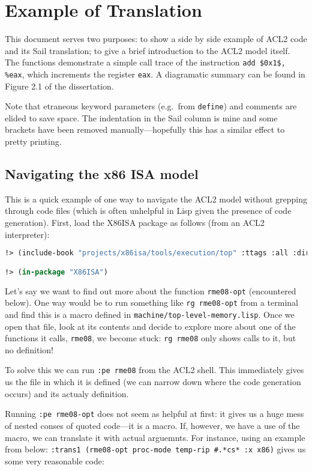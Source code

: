 \documentclass[a4paper]{article}
\begin{document}
\section{Example of Translation}

This document serves two purposes: to show a side by side example of ACL2 code and its Sail translation; to give a brief introduction to the ACL2 model itself.  The functions demonstrate a simple call trace of the instruction \texttt{add \$0x1\$, \%eax}, which increments the register \texttt{eax}.  A diagramatic summary can be found in Figure 2.1 of the dissertation.

Note that etraneous keyword parameters (e.g.~from \texttt{define}) and comments are elided to save space.  The indentation in the Sail column is mine and some brackets have been removed manually---hopefully this has a similar effect to pretty printing.

\subsection{Navigating the x86 ISA model}

This is a quick example of one way to navigate the ACL2 model without grepping through code files (which is often unhelpful in Lisp given the presence of code generation).  First, load the X86ISA package as follows (from an ACL2 interpreter):

\begin{lstlisting}[language=lisp]
!> (include-book "projects/x86isa/tools/execution/top" :ttags :all :dir :system)  

!> (in-package "X86ISA")

\end{lstlisting}

Let's say we want to find out more about the function \texttt{rme08-opt} (encountered below).  One way would be to run something like \texttt{rg rme08-opt} from a terminal and find this is a macro defined in \texttt{machine/top-level-memory.lisp}.  Once we open that file, look at its contents and decide to explore more about one of the functions it calls, \texttt{rme08}, we become stuck: \texttt{rg rme08} only shows calls to it, but no definition!

To solve this we can run \texttt{:pe rme08} from the ACL2 shell.  This immediately gives us the file in which it is defined (we can narrow down where the code generation occurs) and its actualy definition.

Running \texttt{:pe rme08-opt} does not seem as helpful at first: it gives us a huge mess of nested conses of quoted code---it is a macro.  If, however, we have a use of the macro, we can translate it with actual arguemnts.  For instance, using an example from below: \texttt{:trans1 (rme08-opt proc-mode temp-rip \#.*cs* :x x86)} gives us some very reasonable code:
\end{document}
